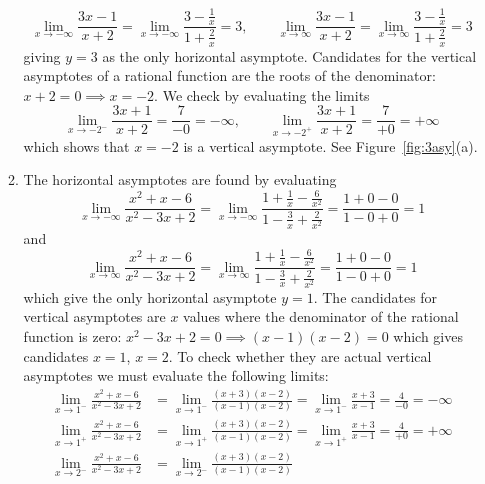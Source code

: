 \documentclass{article}
\begin{document}
\begin{enumerate}
\begin{enumerate}
    \begin{displaymath}
      \lim_{x\to -\infty} \frac{3x-1}{x+2}
      = \lim_{x\to -\infty} \frac{3-\frac{1}{x}}{1+\frac{2}{x}}
      = 3, \qquad
      \lim_{x\to \infty} \frac{3x-1}{x+2}
      = \lim_{x\to \infty} \frac{3-\frac{1}{x}}{1+\frac{2}{x}}
      = 3
    \end{displaymath}
    giving $y=3$ as the only horizontal asymptote.  Candidates for the
    vertical asymptotes of a rational function are the roots of the
    denominator: $x+2=0 \implies x=-2$.  We check by evaluating the limits
    \begin{displaymath}
      \lim_{x\to -2^-} \frac{3x+1}{x+2} = \frac{7}{-0} = -\infty,
      \qquad
      \lim_{x\to -2^+} \frac{3x+1}{x+2} = \frac{7}{+0} = +\infty
    \end{displaymath}
    which shows that $x=-2$ is a vertical asymptote.  See
    Figure~\ref{fig:3asy}(a).
  \item %
    The horizontal asymptotes are found by evaluating
    \begin{displaymath}
      \lim_{x\to -\infty} \frac{x^2+x-6}{x^2-3x+2}
      = \lim_{x\to -\infty} \frac{1+\frac{1}{x}-\frac{6}{x^2}}{
        1 - \frac{3}{x} + \frac{2}{x^2}}
      = \frac{1+0-0}{1-0+0} = 1
    \end{displaymath}
    and
    \begin{displaymath}
      \lim_{x\to \infty} \frac{x^2+x-6}{x^2-3x+2}
      = \lim_{x\to \infty} \frac{1+\frac{1}{x}-\frac{6}{x^2}}{
        1 - \frac{3}{x} + \frac{2}{x^2}}
      = \frac{1+0-0}{1-0+0} = 1
    \end{displaymath}
    which give the only horizontal asymptote $y=1$.  The candidates
    for vertical asymptotes are $x$ values where the denominator of
    the rational function is zero: $x^2-3x+2=0 \implies (x-1)(x-2)=0$
    which gives candidates $x=1$, $x=2$.  To check whether they are
    actual vertical asymptotes we must evaluate the following limits:
    \begin{align*}
      \lim_{x\to 1^-} \frac{x^2+x-6}{x^2-3x+2}
      &= \lim_{x\to 1^-} \frac{(x+3)(x-2)}{(x-1)(x-2)}
        = \lim_{x\to 1^-} \frac{x+3}{x-1} = \frac{4}{-0} = -\infty \\
      \lim_{x\to 1^+} \frac{x^2+x-6}{x^2-3x+2}
      &= \lim_{x\to 1^+} \frac{(x+3)(x-2)}{(x-1)(x-2)}
        = \lim_{x\to 1^+} \frac{x+3}{x-1} = \frac{4}{+0} = +\infty \\
      \lim_{x\to 2^-} \frac{x^2+x-6}{x^2-3x+2}
      &= \lim_{x\to 2^-} \frac{(x+3)(x-2)}{(x-1)(x-2)}

\end{align*}
\end{enumerate}
\end{enumerate}
\end{document}
